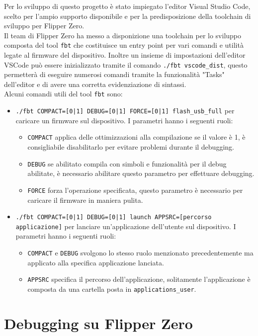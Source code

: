 Per lo sviluppo di questo progetto è stato impiegato l'editor Visual Studio Code, scelto per l'ampio supporto disponibile e per la predisposizione della toolchain di sviluppo per Flipper Zero.\\
Il team di Flipper Zero ha messo a disponizione una toolchain per lo sviluppo composta del tool \texttt{fbt} \cite{fbt} che costituisce un entry point per vari comandi e utilità legate al firmware del dispositivo. Inoltre un insieme di impostazioni dell'editor VSCode può essere inizializzato tramite il comando \texttt{./fbt vscode\_dist}, questo permetterà di eseguire numerosi comandi tramite la funzionalità "Tasks" dell'editor e di avere una corretta evidenziazione di sintassi.\\
Alcuni comandi utili del tool \texttt{fbt} sono:
\begin{itemize}
  \item \texttt{./fbt COMPACT=[0|1] DEBUG=[0|1] FORCE=[0|1] flash\_usb\_full} per caricare un firmware sul dispositivo. I parametri hanno i seguenti ruoli:
  \begin{itemize}
    \item \texttt{COMPACT} applica delle ottimizzazioni alla compilazione se il valore è 1, è consigliabile disabilitarlo per evitare problemi durante il debugging.
    \item \texttt{DEBUG} se abilitato compila con simboli e funzionalità per il debug abilitate, è necessario abilitare questo parametro per effettuare debugging.
    \item \texttt{FORCE} forza l'operazione specificata, questo parametro è necessario per caricare il firmware in maniera pulita.
  \end{itemize}
  \item \texttt{./fbt COMPACT=[0|1] DEBUG=[0|1] launch APPSRC=[percorso applicazione]} per lanciare un'applicazione dell'utente sul dispositivo. I parametri hanno i seguenti ruoli:
  \begin{itemize}
    \item \texttt{COMPACT} e \texttt{DEBUG} svolgono lo stesso ruolo menzionato precedentemente ma applicato alla specifica applicazione lanciata.
    \item \texttt{APPSRC} specifica il percorso dell'applicazione, solitamente l'applicazione è composta da una cartella posta in \texttt{applications\_user}.
  \end{itemize}
\end{itemize}

\section{Debugging su Flipper Zero}
\label{sec:flip_dbg}


